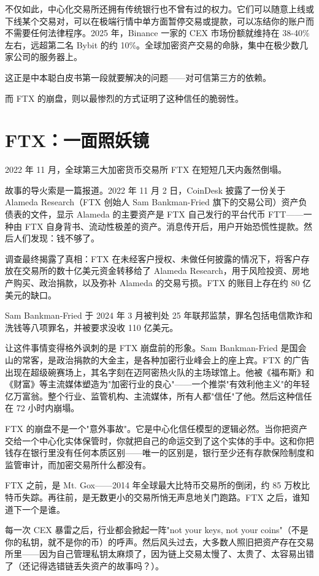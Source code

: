 \documentclass[a4paper,12pt,openany]{ctexbook}
\begin{document}
不仅如此，中心化交易所还拥有传统银行也不曾有过的权力。它们可以随意上线或下线某个交易对，可以在极端行情中单方面暂停交易或提款，可以冻结你的账户而不需要任何法律程序。2025 年，Binance 一家的 CEX 市场份额就维持在 38-40\% 左右，远超第二名 Bybit 的约 10\%。全球加密资产交易的命脉，集中在极少数几家公司的服务器上。

这正是中本聪白皮书第一段就要解决的问题——对可信第三方的依赖。

而 FTX 的崩盘，则以最惨烈的方式证明了这种信任的脆弱性。


\section*{FTX：一面照妖镜}


2022 年 11 月，全球第三大加密货币交易所 FTX 在短短几天内轰然倒塌。

故事的导火索是一篇报道。2022 年 11 月 2 日，CoinDesk 披露了一份关于 Alameda Research（FTX 创始人 Sam Bankman-Fried 旗下的交易公司）资产负债表的文件，显示 Alameda 的主要资产是 FTX 自己发行的平台代币 FTT——一种由 FTX 自身背书、流动性极差的资产。消息传开后，用户开始恐慌性提款。然后人们发现：钱不够了。

调查最终揭露了真相：FTX 在未经客户授权、未做任何披露的情况下，将客户存放在交易所的数十亿美元资金转移给了 Alameda Research，用于风险投资、房地产购买、政治捐款，以及弥补 Alameda 的交易亏损。FTX 的账目上存在约 80 亿美元的缺口。

Sam Bankman-Fried 于 2024 年 3 月被判处 25 年联邦监禁，罪名包括电信欺诈和洗钱等八项罪名，并被要求没收 110 亿美元。

让这件事情变得格外讽刺的是 FTX 崩盘前的形象。Sam Bankman-Fried 是国会山的常客，是政治捐款的大金主，是各种加密行业峰会上的座上宾。FTX 的广告出现在超级碗赛场上，其名字刻在迈阿密热火队的主场球馆上。他被《福布斯》和《财富》等主流媒体塑造为"加密行业的良心"——一个推崇"有效利他主义"的年轻亿万富翁。整个行业、监管机构、主流媒体，所有人都"信任"了他。然后这种信任在 72 小时内崩塌。

FTX 的崩盘不是一个"意外事故"。它是中心化信任模型的逻辑必然。当你把资产交给一个中心化实体保管时，你就把自己的命运交到了这个实体的手中。这和你把钱存在银行里没有任何本质区别——唯一的区别是，银行至少还有存款保险制度和监管审计，而加密交易所什么都没有。

FTX 之前，是 Mt. Gox——2014 年全球最大比特币交易所的倒闭，约 85 万枚比特币失踪。再往前，是无数更小的交易所悄无声息地关门跑路。FTX 之后，谁知道下一个是谁。

每一次 CEX 暴雷之后，行业都会掀起一阵"not your keys, not your coins"（不是你的私钥，就不是你的币）的呼声。然后风头过去，大多数人照旧把资产存在交易所里——因为自己管理私钥太麻烦了，因为链上交易太慢了、太贵了、太容易出错了（还记得选错链丢失资产的故事吗？）。
\end{document}
